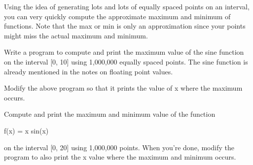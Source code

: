 Using the idea of generating lots and lots of equally spaced points on
an interval, you can very quickly compute the approximate maximum and
minimum of functions. Note that the max or min is only an approximation
since your points might miss the actual maximum and minimum.

\begin{ex}
Write a program to compute and print the maximum
value of the sine function on the interval [0, 10] using 1,000,000
equally spaced points. The sine function is already mentioned in the
notes on floating point values.
\end{ex}

\begin{ex}
Modify the above program so that it prints the value
of x where the maximum occurs.
\end{ex}

\begin{ex}
Compute and print the maximum and minimum value of
the function
\begin{center}
f(x) = x sin(x)
\end{center}
on the interval [0, 20] using 1,000,000 points. When you're done, modify the program to also print the x value where the maximum and minimum occurs.
\end{ex}
